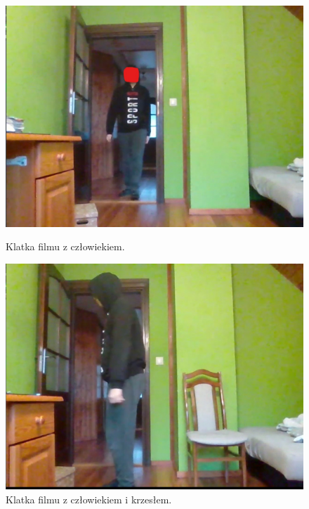 \begin{figure}[H]
    \centering
    \begin{minipage}{0.32\textwidth}
        \centering
        \includegraphics[width=\linewidth]{r_test_dokładności/vid_pics/1_2.jpg}
        \caption{Klatka filmu z człowiekiem.}
    \end{minipage}\hfill
    \begin{minipage}{0.32\textwidth}
        \centering
        \includegraphics[width=\linewidth]{r_test_dokładności/vid_pics/1c_2.jpg}
        \caption{Klatka filmu z człowiekiem i krzesłem.}
    \end{minipage}\hfill
    \begin{minipage}{0.32\textwidth}
        \centering

\end{minipage}
\end{figure}
